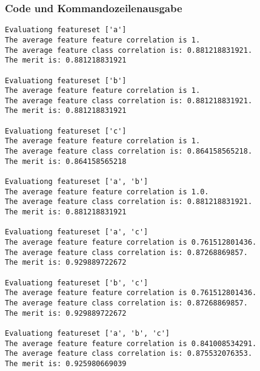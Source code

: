 \documentclass{article}
\begin{document}
\subsubsection{Code und Kommandozeilenausgabe}

\begin{lstlisting}[title=Kommandozeilenausgabe]
Evaluationg featureset ['a']
The average feature feature correlation is 1.
The average feature class correlation is: 0.881218831921.
The merit is: 0.881218831921

Evaluationg featureset ['b']
The average feature feature correlation is 1.
The average feature class correlation is: 0.881218831921.
The merit is: 0.881218831921

Evaluationg featureset ['c']
The average feature feature correlation is 1.
The average feature class correlation is: 0.864158565218.
The merit is: 0.864158565218

Evaluationg featureset ['a', 'b']
The average feature feature correlation is 1.0.
The average feature class correlation is: 0.881218831921.
The merit is: 0.881218831921

Evaluationg featureset ['a', 'c']
The average feature feature correlation is 0.761512801436.
The average feature class correlation is: 0.87268869857.
The merit is: 0.929889722672

Evaluationg featureset ['b', 'c']
The average feature feature correlation is 0.761512801436.
The average feature class correlation is: 0.87268869857.
The merit is: 0.929889722672

Evaluationg featureset ['a', 'b', 'c']
The average feature feature correlation is 0.841008534291.
The average feature class correlation is: 0.875532076353.
The merit is: 0.925980669039

\end{lstlisting}
\end{document}
